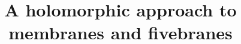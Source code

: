 \documentclass[11pt]{amsart}
\begin{document}
\title{A holomorphic approach to membranes and fivebranes}








 
 



\end{document}
